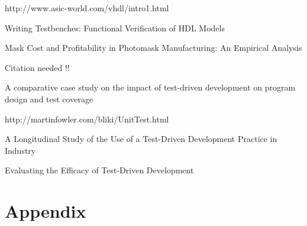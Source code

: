 \documentclass[11pt,british]{article}
\newcommand\blankpage{%
    \null
    \thispagestyle{empty}%
    \addtocounter{page}{-1}%
    \newpage}
\begin{document}
\pagebreak{}
\begin{thebibliography}{1}
http://www.asic-world.com/vhdl/intro1.html

Writing Testbenches: Functional Verification of HDL
Models

Mask Cost and Profitability in Photomask Manufacturing:
An Empirical Analysis

Citation needed !!

A comparative case study on the impact of test-driven
development on program design and test coverage

http://martinfowler.com/bliki/UnitTest.html

A Longitudinal Study of the Use of a Test-Driven Development
Practice in Industry

Evaluating the Efficacy of Test-Driven Development

\end{thebibliography}


\newpage{}
\part{Appendix}


\afterpage{\blankpage}
\end{document}
